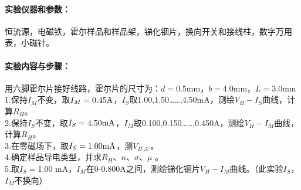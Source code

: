 \documentclass[UTF8]{ctexart}
\begin{document}
\paragraph*{实验仪器和参数：}恒流源，电磁铁，霍尔样品和样品架，锑化铟片，换向开关和接线柱，数字万用表，小磁针。
\paragraph*{实验内容与步骤：}
用六脚霍尔片接好线路，霍尔片的尺寸为：$d=$0.5mm，$b=$4.0mm，$L=$3.0mm~\\
1.保持$I_{M}$不变，取$I_{M}=\rm{0.45A}$，$I_{S}$取1.00,1.50……,4.50mA，测绘$V_{H}-I_{S}$曲线，计算$R_{H}$。~\\
2.保持$I_{S}$不变，取$I_{S}=\rm{4.50mA}$，$I_{M}$取0.100,0.150……,0.450A，测绘$V_{H}-I_{M}$曲线，计算$R_{H}$。~\\
3.在零磁场下，取$I_{S}=\rm{1.00mA}$，测$V_{B'A'}$。~\\
4.确定样品导电类型，并求$R_{H}$、$n$、$\sigma$、$\mu$ 。~\\
5.取$I_{S}=$1.00 mA，$I_{M}$在0-0.800A之间，测绘锑化铟片$V_{H}-I_{M}$曲线。（此实验$I_{S}$， $I_{M}$不换向）
\end{document}

